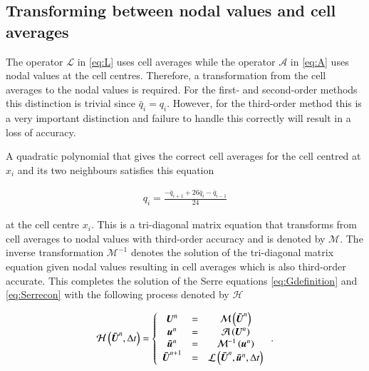 \documentclass[SingleSpace,12pt,Proceedings]{Serre_ASCE}
\begin{document}
\subsection{Transforming between nodal values and cell averages} %
The operator $\mathcal{L}$ in \eqref{eq:L} uses cell averages while the operator $\mathcal{A}$ in \eqref{eq:A} uses nodal values at the cell centres. Therefore, a transformation from the cell averages to the nodal values is required. For the first- and second-order methods this distinction is trivial since $\bar{q}_i = q_i$. However, for the third-order method this is a very important distinction and failure to handle this correctly will result in a loss of accuracy. 

A quadratic polynomial that gives the correct cell averages for the cell centred at $x_i$ and its two neighbours satisfies this equation
\begin{linenomath*}
\begin{gather*} %
q_i = \frac{- \bar{q}_{i+1} + 26\bar{q}_{i} - \bar{q}_{i-1}}{24}
\end{gather*}
\end{linenomath*}
at the cell centre $x_i$. This is a tri-diagonal matrix equation that transforms from cell averages to nodal values with third-order accuracy and is denoted by $\mathcal{M}$. The inverse transformation $\mathcal{M}^{-1}$ denotes the solution of the tri-diagonal matrix equation given nodal values resulting in cell averages which is also third-order accurate. This completes the solution of the Serre equations \eqref{eq:Gdefinition} and \eqref{eq:Serrecon} with the following process denoted by $\mathcal{H}$
\begin{linenomath*}
\begin{gather*}
\mathcal{H}\left(\boldsymbol{\bar{U}}^n,\Delta t \right) = \left\lbrace 
\begin{array}{c c c} 
	\boldsymbol{U}^n &=& \mathcal{M}\left(\boldsymbol{\bar{U}}^n\right) \\
	\boldsymbol{u}^n &=& \mathcal{A}\left(\boldsymbol{U}^n\right) \\
	\boldsymbol{\bar{u}}^n &=&  \mathcal{M}^{-1}\left(\boldsymbol{u}^n\right) \\
	\boldsymbol{\bar{U}}^{n+1} &=& \mathcal{L}\left(\boldsymbol{\bar{U}}^{n},\boldsymbol{\bar{u}}^n,\Delta t\right)							
\end{array} \right. .
\end{gather*}
\end{linenomath*}
\end{document}
